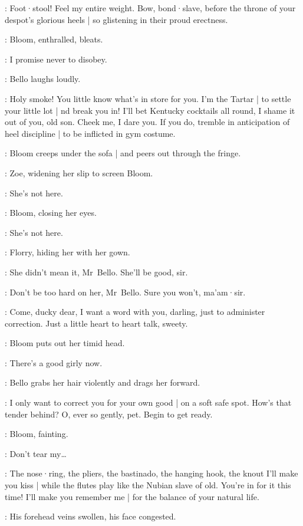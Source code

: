 \Bello:
Foot·stool!
Feel my entire weight.
Bow,
bond·slave,
before the throne of your despot's glorious heels |
so glistening in their proud erectness.

:
Bloom,
enthralled,
bleats.

\Bloom:
I promise never to disobey.

:
Bello laughs loudly.

\Bello:
Holy smoke!
You little know what's in store for you.
I'm the Tartar |
to settle your little lot  |
nd break you in!
I'll bet Kentucky cocktails all round,
I shame it out of you,
old son.
Cheek me,
I dare you.
If you do,
tremble in anticipation of heel discipline |
to be inflicted in gym costume.%

:
Bloom creeps under the sofa |
and peers out through the fringe.

:
Zoe,
widening her slip to screen Bloom.

\Zoe:
She's not here.

:
Bloom,
closing her eyes.

\Bloom:
She's not here.

:
Florry,
hiding her with her gown.

\Florry:
She didn't mean it,
Mr~Bello.
She'll be good,
sir.

\Kitty:
Don't be too hard on her,
Mr~Bello.
%
Sure you won't,
ma'am·sir.

\Bello:
Come,
ducky dear,
I want a word with you,
darling,
just to administer correction.
Just a little heart to heart talk,
sweety.

:
Bloom puts out her timid head.

\Bello:
There's a good girly now.

:
Bello grabs her hair violently and drags her forward.

\Bello:
I only want to correct you for your own good |
on a soft safe spot.
How's that tender behind?
O,
ever so gently,
pet.
Begin to get ready.

:
Bloom,
fainting.

\Bloom:
Don't tear my…

\Bello:
The nose·ring,
the pliers,
the bastinado,
the hanging hook,
the knout I'll make you kiss |
while the flutes play like the Nubian slave of old.
You're in for it this time!
I'll make you remember me |
for the balance of your natural life.

:
His forehead veins swollen,
his face congested.


